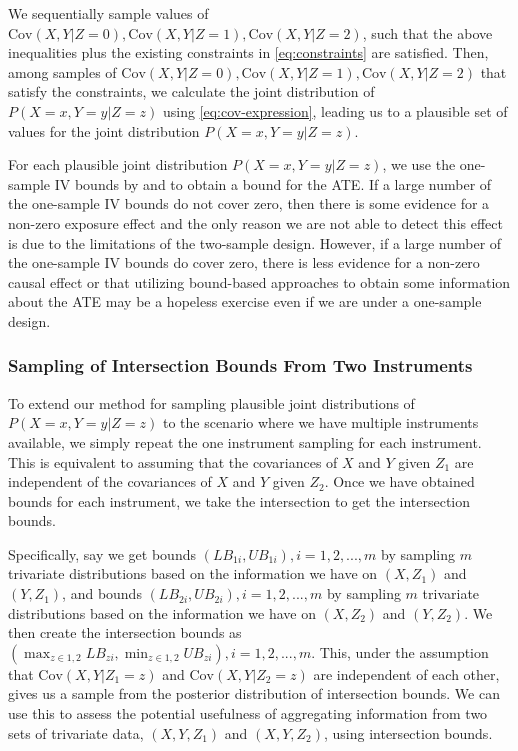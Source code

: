 \documentclass[
]{article}
\theoremstyle{plain}
\begin{document}
We sequentially sample values of \(\text{Cov}(X, Y | Z = 0), \text{Cov}(X, Y | Z = 1), \text{Cov}(X, Y | Z = 2)\), such that the above inequalities plus the existing constraints in \eqref{eq:constraints} are satisfied. Then, among samples of \(\text{Cov}(X, Y | Z = 0), \text{Cov}(X, Y | Z = 1), \text{Cov}(X, Y | Z = 2)\) that satisfy the constraints, we calculate the joint distribution of \(P(X = x, Y = y | Z = z)\) using \eqref{eq:cov-expression}, leading us to a plausible set of values for the joint distribution \(P(X = x, Y = y | Z = z)\).

For each plausible joint distribution \(P(X = x, Y = y | Z = z)\), we use the one-sample IV bounds by \textcite{balke_bounds_1997} and \textcite{richardson_ace_2014} to obtain a bound for the ATE. If a large number of the one-sample IV bounds do not cover zero, then there is some evidence for a non-zero exposure effect and the only reason we are not able to detect this effect is due to the limitations of the two-sample design. However, if a large number of the one-sample IV bounds do cover zero, there is less evidence for a non-zero causal effect or that utilizing bound-based approaches to obtain some information about the ATE may be a hopeless exercise even if we are under a one-sample design.

\hypertarget{sampling-of-intersection-bounds-from-two-instruments}{%
\subsubsection{\texorpdfstring{Sampling of Intersection Bounds From Two Instruments \label{sample-intersection-bounds}}{Sampling of Intersection Bounds From Two Instruments }}\label{sampling-of-intersection-bounds-from-two-instruments}}

To extend our method for sampling plausible joint distributions of \(P(X = x, Y = y | Z = z)\) to the scenario where we have multiple instruments available, we simply repeat the one instrument sampling for each instrument. This is equivalent to assuming that the covariances of \(X\) and \(Y\) given \(Z_1\) are independent of the covariances of \(X\) and \(Y\) given \(Z_2\). Once we have obtained bounds for each instrument, we take the intersection to get the intersection bounds.

Specifically, say we get bounds \((LB_{1i},UB_{1i}),i = 1,2,...,m\) by sampling \(m\) trivariate distributions based on the information we have on \((X,Z_1)\) and \((Y,Z_1)\), and bounds \((LB_{2i}, UB_{2i}),i = 1,2,...,m\) by sampling \(m\) trivariate distributions based on the information we have on \((X,Z_2)\) and \((Y,Z_2)\). We then create the intersection bounds as \(\left(\max_{z \in {1,2}} LB_{zi}, \min_{z \in {1,2}} UB_{zi}\right), i = 1, 2, ..., m\). This, under the assumption that \(\text{Cov}(X, Y | Z_1 = z)\) and \(\text{Cov}(X, Y | Z_2 = z)\) are independent of each other, gives us a sample from the posterior distribution of intersection bounds. We can use this to assess the potential usefulness of aggregating information from two sets of trivariate data, \((X, Y, Z_1)\) and \((X, Y, Z_2)\), using intersection bounds.
\end{document}
